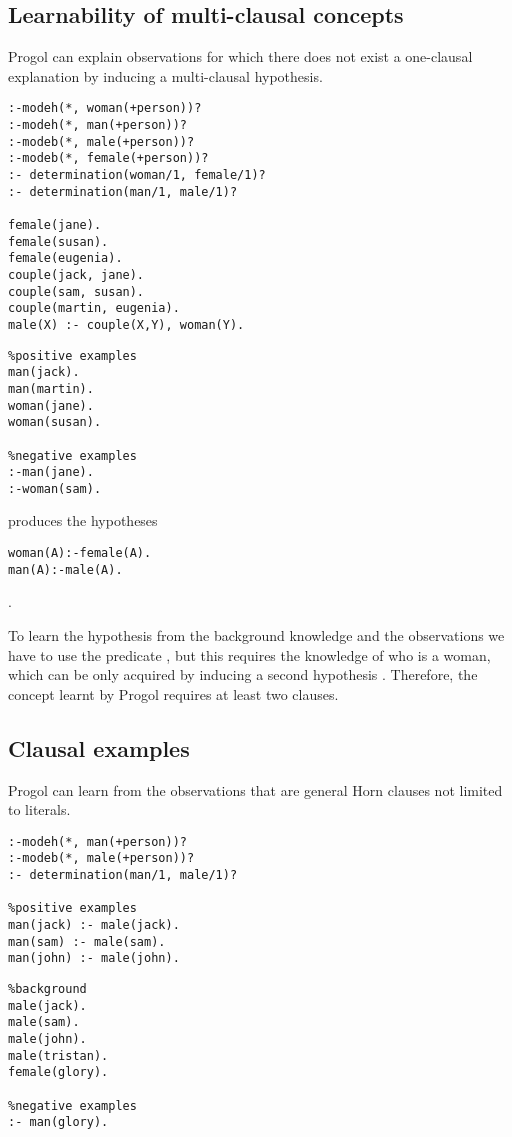 \subsection{Learnability of multi-clausal concepts}
Progol can explain observations for which there does not exist a one-clausal explanation by inducing a multi-clausal hypothesis.

\begin{minipage}[t]{.60\textwidth}
\begin{lstlisting}
:-modeh(*, woman(+person))?
:-modeh(*, man(+person))?
:-modeb(*, male(+person))?
:-modeb(*, female(+person))?
:- determination(woman/1, female/1)?
:- determination(man/1, male/1)?

female(jane).
female(susan).
female(eugenia).
couple(jack, jane).
couple(sam, susan).
couple(martin, eugenia).
male(X) :- couple(X,Y), woman(Y).\end{lstlisting}
\end{minipage}
\begin{minipage}[t]{.20\textwidth}
\begin{lstlisting}
%positive examples
man(jack).
man(martin).
woman(jane).
woman(susan).

%negative examples
:-man(jane).
:-woman(sam).
\end{lstlisting}
\end{minipage}

produces the hypotheses
\begin{lstlisting}
woman(A):-female(A).
man(A):-male(A).
\end{lstlisting}.

To learn the hypothesis  from the background knowledge and the observations we have to use the predicate , but this requires the knowledge of who is a woman, which can be only acquired by inducing a second hypothesis . Therefore, the concept learnt by Progol requires at least two clauses.

\subsection{Clausal examples}
Progol can learn from the observations that are general Horn clauses not limited to literals.

\begin{minipage}[t]{.60\textwidth}
\begin{lstlisting}
:-modeh(*, man(+person))?
:-modeb(*, male(+person))?
:- determination(man/1, male/1)?

%positive examples
man(jack) :- male(jack).
man(sam) :- male(sam).
man(john) :- male(john).
\end{lstlisting}
\end{minipage}
\begin{minipage}[t]{.20\textwidth}
\begin{lstlisting}
%background
male(jack).
male(sam).
male(john).
male(tristan).
female(glory).

%negative examples
:- man(glory).
\end{lstlisting}
\end{minipage}

